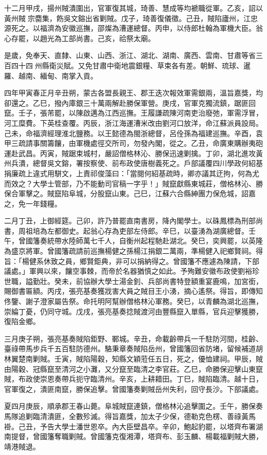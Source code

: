 \begin{pinyinscope}
十二月甲戌，揚州賊潰圍出，官軍復其城，琦善、慧成等均褫職從軍。乙亥，詔以黃州賊宗麕集，飭吳文鎔出省剿賊。戊子，琦善復儀徵。己丑，賊陷廬州，江忠源死之。以福濟為安徽巡撫，邵燦為漕運總督。丙申，以侍郎杜翰為軍機大臣。翁心存罷，以趙光為工部尚書。己亥，祫祭太廟。

是歲，免奉天、直隸、山東、山西、浙江、湖北、湖南、廣西、雲南、甘肅等省三百四十四州縣衛災賦。又免甘肅中衛地震銀糧、草束各有差。朝鮮、琉球、暹羅、越南、緬甸、南掌入貢。

四年甲寅春正月辛丑朔，蒙古各盟長親王、郡王迭次報效軍需銀兩，溫旨嘉獎，均卻還之。乙巳，撥內庫銀三十萬兩解赴勝保軍營。庚戌，官軍克獨流鎮，踞匪回竄。壬子，張芾罷，以陳啟邁為江西巡撫。王履謙疏陳河南吏治廢弛，軍需浮冒，河工糜費。下英桂查覆。丙辰，浙江海運漕米改由劉河口放洋，命江蘇派員設局。己未，命福濟經理淮北鹽務。以王懿德為閩浙總督，呂佺孫為福建巡撫。辛酉，袁甲三疏請事關籌饟，由軍機處徑交所司，勿發內閣，從之。乙丑，命廣東購辦夷砲運赴武昌。丙寅，賊踞束城村，嚴詔僧格林沁、勝保迅速剿擒。丁卯，湖北進攻黃州兵潰，總督吳文鎔，署按察使、前布政使唐樹義死之。戶部議覆四川學政何紹基捐廉疏上違式用駢文，上責祁俊藻曰：「當閱何紹基疏時，卿亦議其迂拘，何為尤而效之？大學士管部，乃不能動司官稿一字乎！」賊竄獻縣東城莊，僧格林沁、勝保合軍擊之。賊竄陷阜城，分股竄山東。己巳，江蘇六合縣紳團力保危城，詔嘉之，免一年錢糧。

二月丁丑，上御經筵。己卯，許乃普罷直南書房，降內閣學士。以硃鳳標為刑部尚書，周祖培為左都御史。起翁心存為吏部左侍郎。辛巳，以臺湧為湖廣總督。壬午，曾國籓奏統帶水陸師萬七千人，自衡州起程馳赴湖北。癸巳，奕興罷，以英隆為盛京將軍。曾國籓疏請前巡撫楊健之孫楊江捐銀二萬兩，準楊健入祀鄉賢祠。得旨：「楊健系休致之員，鄉賢鉅典，非可以捐納得之。曾國籓不應遽為陳請，下部議處。」軍興以來，饟空事棘，而帝於名器猶慎之如此。予殉難安徽布政使劉裕珍世職，謚勤壯。癸未，前協辦大學士湯金釗、兵部尚書特登額重宴鹿鳴，加宮銜，賜御書匾額。丙戌，張亮基奏獲戕害大員之賊目王小湧，摘心遙祭。得旨，即傳知佟鑒、謝子澄家屬告祭。命托明阿幫辦僧格林沁軍務。癸巳，以青麟為湖北巡撫，崇綸丁憂，仍同守城。戊戌，張亮基奏捻賊渡河由豐縣竄入單縣，官兵迎擊獲勝，復陷金鄉。

三月庚子朔，張亮基奏賊陷鉅野、鄆城。辛丑，命載齡帶兵一千駐防河間，桂齡、臺祿帶馬步兵千五百駐防德州。駱秉章奏賊陷岳州，曾國籓回省防堵，留候補道胡林翼楚南剿賊。壬寅，賊陷陽穀，知縣文穎蒞任五日，死之，優恤建祠。甲辰，賊由陽穀、冠縣竄至清河之小灘，又分竄至臨清之李官莊。乙巳，命勝保迎擊山東竄賊，布政使崇恩奏帶兵扼守臨清州。辛亥，上耕耤田。丁巳，賊陷臨清。越十日，官軍復之，潰匪南竄，勝保追擊。曾國籓奏剿賊岳州失利，回守長沙。下部議處。

夏四月庚辰，順承郡王春山薨。阜城賊竄連鎮，僧格林沁追擊圍之。壬午，勝保奏馬隊追剿臨清潰匪，全數殄滅。得旨嘉獎，加太子少保，德勒克色楞、善祿黃馬褂。己丑，予告大學士潘世恩卒。內大臣壁昌卒。辛卯，鮑起豹罷，以塔齊布署湖南提督，曾國籓奪職剿賊。曾國籓克復湘潭，塔齊布、彭玉麟、楊載福剿賊大勝，靖港賊退。


\end{pinyinscope}
